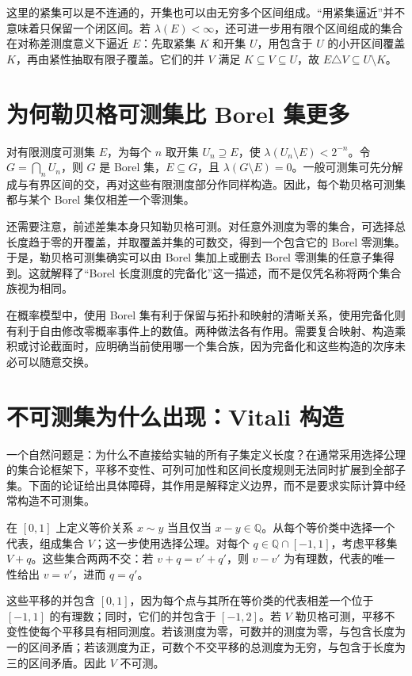 \documentclass[UTF8,12pt,a4paper,fontset=fandol]{ctexbook}
\begin{document}
这里的紧集可以是不连通的，开集也可以由无穷多个区间组成。“用紧集逼近”并不意味着只保留一个闭区间。若 $\lambda(E)<\infty$，还可进一步用有限个区间组成的集合在对称差测度意义下逼近 $E$：先取紧集 $K$ 和开集 $U$，用包含于 $U$ 的小开区间覆盖 $K$，再由紧性抽取有限子覆盖。它们的并 $V$ 满足 $K\subseteq V\subseteq U$，故 $E\triangle V\subseteq U\setminus K$。

\section{为何勒贝格可测集比 Borel 集更多}
对有限测度可测集 $E$，为每个 $n$ 取开集 $U_n\supseteq E$，使 $\lambda(U_n\setminus E)<2^{-n}$。令 $G=\bigcap_nU_n$，则 $G$ 是 Borel 集，$E\subseteq G$，且 $\lambda(G\setminus E)=0$。一般可测集可先分解成与有界区间的交，再对这些有限测度部分作同样构造。因此，每个勒贝格可测集都与某个 Borel 集仅相差一个零测集。

还需要注意，前述差集本身只知勒贝格可测。对任意外测度为零的集合，可选择总长度趋于零的开覆盖，并取覆盖并集的可数交，得到一个包含它的 Borel 零测集。于是，勒贝格可测集确实可以由 Borel 集加上或删去 Borel 零测集的任意子集得到。这就解释了“Borel 长度测度的完备化”这一描述，而不是仅凭名称将两个集合族视为相同。

在概率模型中，使用 Borel 集有利于保留与拓扑和映射的清晰关系，使用完备化则有利于自由修改零概率事件上的数值。两种做法各有作用。需要复合映射、构造乘积或讨论截面时，应明确当前使用哪一个集合族，因为完备化和这些构造的次序未必可以随意交换。

\section{不可测集为什么出现：Vitali 构造}
\label{sec:mt-vitali-set}
一个自然问题是：为什么不直接给实轴的所有子集定义长度？在通常采用选择公理的集合论框架下，平移不变性、可列可加性和区间长度规则无法同时扩展到全部子集。下面的论证给出具体障碍，其作用是解释定义边界，而不是要求实际计算中经常构造不可测集。

在 $[0,1]$ 上定义等价关系 $x\sim y$ 当且仅当 $x-y\in\mathbb Q$。从每个等价类中选择一个代表，组成集合 $V$；这一步使用选择公理。对每个 $q\in\mathbb Q\cap[-1,1]$，考虑平移集 $V+q$。这些集合两两不交：若 $v+q=v'+q'$，则 $v-v'$ 为有理数，代表的唯一性给出 $v=v'$，进而 $q=q'$。

这些平移的并包含 $[0,1]$，因为每个点与其所在等价类的代表相差一个位于 $[-1,1]$ 的有理数；同时，它们的并包含于 $[-1,2]$。若 $V$ 勒贝格可测，平移不变性使每个平移具有相同测度。若该测度为零，可数并的测度为零，与包含长度为一的区间矛盾；若该测度为正，可数个不交平移的总测度为无穷，与包含于长度为三的区间矛盾。因此 $V$ 不可测。
\end{document}
